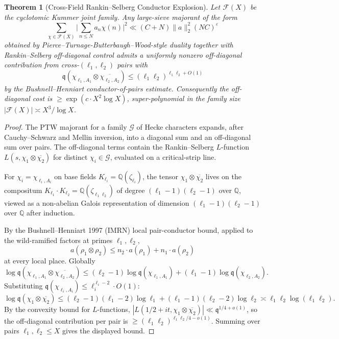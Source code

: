 \documentclass[11pt]{article}
\newtheorem{theorem}{Theorem}
\newcommand{\Q}{\mathbb Q}
\begin{document}
\begin{theorem}[Cross-Field Rankin--Selberg Conductor Explosion]\label{T:cross-field}
Let $\mathcal F(X)$ be the cyclotomic Kummer joint family.  Any large-sieve majorant of the form
\[
\sum_{\chi\in\mathcal F(X)}\Big|\sum_{n\le N}a_n\chi(n)\Big|^2\ll(C+N)\|a\|_2^2(NC)^\varepsilon
\]
obtained by Pierce--Turnage-Butterbaugh--Wood-style duality together with Rankin--Selberg off-diagonal control admits a uniformly nonzero off-diagonal contribution from cross-$(\ell_1,\ell_2)$ pairs with
\[
\mathfrak q(\chi_{\ell_1,A_1}\otimes\overline{\chi_{\ell_2,A_2}})\le(\ell_1\ell_2)^{\ell_1\ell_2+O(1)}
\]
by the Bushnell--Henniart conductor-of-pairs estimate.  Consequently the off-diagonal cost is $\ge\exp(c\cdot X^2\log X)$, super-polynomial in the family size $|\mathcal F(X)|\asymp X^3/\log X$.
\end{theorem}

\begin{proof}
The PTW majorant for a family $\mathcal G$ of Hecke characters expands, after Cauchy--Schwarz and Mellin inversion, into a diagonal sum and an off-diagonal sum over pairs.  The off-diagonal terms contain the Rankin--Selberg $L$-function $L(s,\chi_1\otimes\overline{\chi_2})$ for distinct $\chi_i\in\mathcal G$, evaluated on a critical-strip line.

For $\chi_i=\chi_{\ell_i,A_i}$ on base fields $K_{\ell_i}=\Q(\zeta_{\ell_i})$, the tensor $\chi_1\otimes\overline{\chi_2}$ lives on the compositum $K_{\ell_1}\cdot K_{\ell_2}=\Q(\zeta_{\ell_1\ell_2})$ of degree $(\ell_1-1)(\ell_2-1)$ over $\Q$, viewed as a non-abelian Galois representation of dimension $(\ell_1-1)(\ell_2-1)$ over $\Q$ after induction.

By the Bushnell--Henniart 1997 (IMRN) local pair-conductor bound, applied to the wild-ramified factors at primes $\ell_1,\ell_2$,
\[
a(\rho_1\otimes\rho_2)\le n_2\cdot a(\rho_1)+n_1\cdot a(\rho_2)
\]
at every local place.  Globally
\[
\log\mathfrak q(\chi_{\ell_1,A_1}\otimes\overline{\chi_{\ell_2,A_2}})\le(\ell_2-1)\log\mathfrak q(\chi_{\ell_1,A_1})+(\ell_1-1)\log\mathfrak q(\chi_{\ell_2,A_2}).
\]
Substituting $\mathfrak q(\chi_{\ell_i,A_i})\le\ell_i^{\ell_i-2}\cdot O(1)$:
\[
\log\mathfrak q(\chi_1\otimes\overline{\chi_2})\le(\ell_2-1)(\ell_1-2)\log\ell_1+(\ell_1-1)(\ell_2-2)\log\ell_2\asymp\ell_1\ell_2\log(\ell_1\ell_2).
\]
By the convexity bound for $L$-functions, $|L(1/2+it,\chi_1\otimes\overline{\chi_2})|\ll\mathfrak q^{1/4+o(1)}$, so the off-diagonal contribution per pair is $\ge(\ell_1\ell_2)^{\ell_1\ell_2/4-o(1)}$.  Summing over pairs $\ell_1,\ell_2\le X$ gives the displayed bound.
\end{proof}
\end{document}
